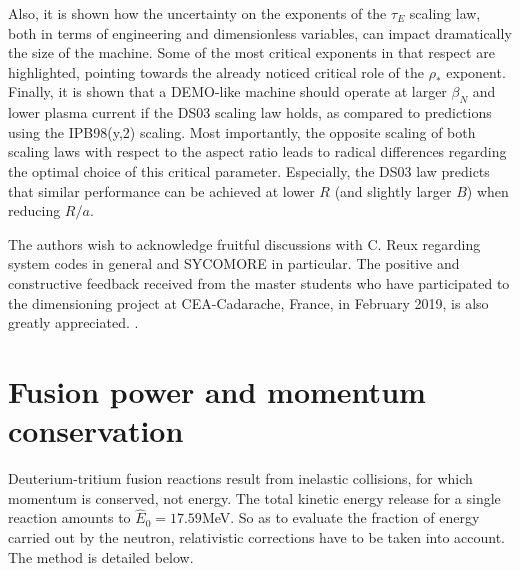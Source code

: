 \documentclass[12pt]{iopart}
\newcommand{\newstuff}[1]{\color{blue}{#1}\color{black}}
\begin{document}
Also, it is shown how the uncertainty on the exponents of the $\tau_E$ scaling law, both in terms of engineering and dimensionless variables, can impact dramatically the size of the machine. Some of the most critical exponents in that respect are highlighted, pointing towards the already noticed critical role of the $\rho_*$ exponent. Finally, it is shown that a DEMO-like machine should operate at larger $\beta_N$ and lower plasma current if the DS03 scaling law holds, as compared to predictions using the IPB98(y,2) scaling. \newstuff{However, the relevance of these large $\beta_N$ plasmas for a reactor may be questioned due to their inherent larger sensitivity to MHD instabilities, and the consequent higher risk of disruptions. } Most importantly, the opposite scaling of both scaling laws with respect to the aspect ratio leads to radical differences regarding the optimal choice of this critical parameter. Especially, the DS03 law predicts that similar performance can be achieved at lower $R$ (and slightly larger $B$) when reducing $R/a$.

\ack

The authors wish to acknowledge fruitful discussions with C. Reux regarding system codes in general and SYCOMORE in particular. The positive and constructive feedback received from the master students who have participated to the dimensioning project at CEA-Cadarache, France, in February 2019, is also greatly appreciated. \newstuff{Finally, we would like to acknowledge the relevant comments and useful suggestions of an anonymous referee}.

\appendix

\section{Fusion power and momentum conservation}
\label{appendix:fusion_power}

Deuterium-tritium fusion reactions result from inelastic collisions, for which momentum is conserved, not energy. The total kinetic energy release for a single reaction amounts to $\widehat E_0 = 17.59$MeV. So as to evaluate the fraction of energy carried out by the neutron, relativistic corrections have to be taken into account. The method is detailed below.
\end{document}
